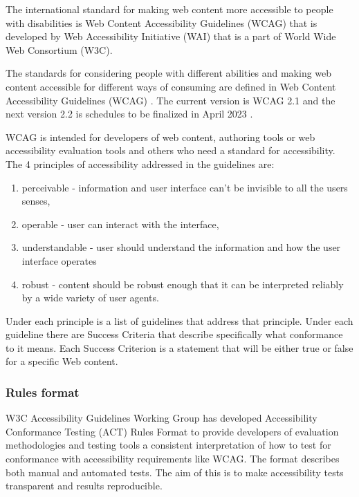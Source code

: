 \documentclass{master_thesis}
\begin{document}
The international standard for making web content more accessible to people with disabilities is Web Content Accessibility Guidelines (WCAG) that is developed by Web Accessibility Initiative (WAI) that is a part of World Wide Web Consortium (W3C).

The standards for considering people with different abilities and making web content accessible for different ways of consuming are defined in Web Content Accessibility Guidelines (WCAG) \citep{Kirkpatrick2018}. The current version is WCAG 2.1 and the next version 2.2 is schedules to be finalized in April 2023 \citep{Henry2023}.

WCAG is intended for developers of web content, authoring tools or web accessibility evaluation tools and others who need a standard for accessibility. The 4 principles of accessibility addressed in the guidelines are:
\begin{enumerate}
	\item perceivable - information and user interface can't be invisible to all the users senses,
	\item operable - user can interact with the interface,
	\item understandable - user should understand the information and how the user interface operates
	\item robust - content should be robust enough that it can be interpreted reliably by a wide variety of user agents.
\end{enumerate}
Under each principle is a list of guidelines that address that principle. Under each guideline there are Success Criteria that describe specifically what conformance to it means. Each Success Criterion is a statement that will be either true or false for a specific Web content.\citep{AGWGP2022}

\subsubsection{Rules format}

W3C Accessibility Guidelines Working Group has developed Accessibility Conformance Testing (ACT) Rules Format to provide developers of evaluation methodologies and testing tools a consistent interpretation of how to test for conformance with accessibility requirements like WCAG. The format describes both manual and automated tests. The aim of this is to make accessibility tests transparent and results reproducible. \citep{Fiers2019}
\end{document}
